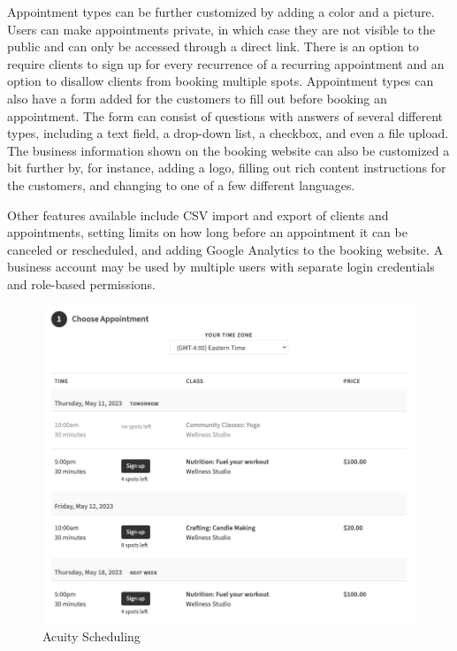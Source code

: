 Appointment types can be further customized by adding a color and a picture. Users can make appointments private, in which case they are not visible to the public and can only be accessed through a direct link. There is an option to require clients to sign up for every recurrence of a recurring appointment and an option to disallow clients from booking multiple spots. Appointment types can also have a form added for the customers to fill out before booking an appointment. The form can consist of questions with answers of several different types, including a text field, a drop-down list, a checkbox, and even a file upload. The business information shown on the booking website can also be customized a bit further by, for instance, adding a logo, filling out rich content instructions for the customers, and changing to one of a few different languages.

Other features available include CSV import and export of clients and appointments, setting limits on how long before an appointment it can be canceled or rescheduled, and adding Google Analytics to the booking website. A business account may be used by multiple users with separate login credentials and role-based permissions.

\begin{figure}
    \centering
    \includegraphics[width=1.0\textwidth]{content/existing_reservation_systems/acuity_scheduling.png}
    \caption[Acuity Scheduling]{Acuity Scheduling~\cite{acuity}}
    \label{fig:acuity_scheduling}
\end{figure}

